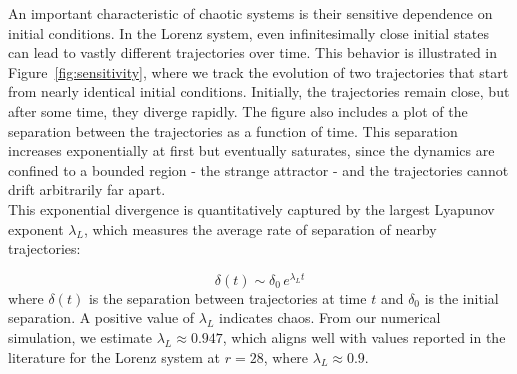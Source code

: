 \documentclass[paper=a4, fontsize=11pt]{scrartcl}
\numberwithin{equation}{section}		%
\numberwithin{figure}{section}			%
\numberwithin{table}{section}				%
\begin{document}
An important characteristic of chaotic systems is their sensitive dependence on initial conditions. In the Lorenz system, even infinitesimally close initial states can lead to vastly different trajectories over time. This behavior is illustrated in Figure~\ref{fig:sensitivity}, where we track the evolution of two trajectories that start from nearly identical initial conditions. Initially, the trajectories remain close, but after some time, they diverge rapidly. The figure also includes a plot of the separation between the trajectories as a function of time. This separation increases exponentially at first but eventually saturates, since the dynamics are confined to a bounded region - the strange attractor - and the trajectories cannot drift arbitrarily far apart.\\

This exponential divergence is quantitatively captured by the largest Lyapunov exponent $\lambda_L$, which measures the average rate of separation of nearby trajectories:

\begin{equation}
	\delta(t) \sim \delta_0 \, e^{\lambda_L t}
\end{equation}
where $\delta(t)$ is the separation between trajectories at time $t$ and $\delta_0$ is the initial separation. A positive value of $\lambda_L$ indicates chaos. From our numerical simulation, we estimate $\lambda_L \approx 0.947$, which aligns well with values reported in the literature for the Lorenz system at $r = 28$, where $\lambda_L \approx 0.9$.
\end{document}
